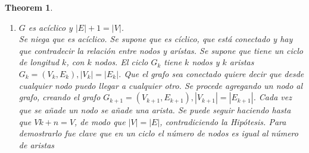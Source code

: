 \documentclass[12pt, fleqn]{article}
\newtheorem{theorem}{Theorem}[section]
\begin{document}
\begin{theorem}
\begin{enumerate}
\begin{proof}
\begin{enumerate}
                                \item Hipótesis de inducción: se supone que el predicado es válido para $k$ aristas. El predicado es que la relación entre nodos y aristas
                                    es  $|E| + 1 = |V| $. Se supone que está conectado y si se quita cualquier arista se desconecta el grafo.
                                \item Se toma cualquier grafo de $k+1$ aristas. Por la Hipótesis se que si se quita una arista se desconecta y quedan
                                    $G_1=(V_1, E_1)$ y  $G_2=(V_2, E_2)$ donde $ 0 \leq |E_1|, |E_2| \leq k$ Lo que queda de los dos lados debe tener
                                    $k$ o menos de $k$ aristas.
                                \item se aplica inducción fuerte.
                                    \begin{align*}
                                        |V| &= |V_1| + |V_2|\\
                                        |V| &= (|E_1| + 1) + (|E_2| + 1)\\
                                        |V| &= (|E_1| + |E_2| +1) + 1\\
                                        |V| &= |E| + 1
                                    \end{align*}
                            \end{enumerate}
                        \end{proof}
                    \item $G$ es acíclico y $|E| + 1 = |V|$. \\ \emph{ Se niega que es acíclico. Se supone que es cíclico, que está conectado y hay
                                que contradecir la relación entre nodos y arístas. Se supone que tiene un ciclo de longitud $k$, con $k$ nodos.
                                El ciclo $G_k$ tiene $k$ nodos y $k$ aristas $G_k=(V_k, E_k), |V_k| = |E_k| $. Que el grafo sea conectado quiere decir que
                                desde cualquier nodo puedo llegar a cualquier otro. Se procede agregando un nodo al grafo, creando el grafo
                                $G_{k+1} = (V_{k+1}, E_{k+1}), |V_{k+1}| = |E_{k+1}| $. Cada vez que se añade un nodo se añade una arista.
                                Se puede seguir haciendo hasta que $V{k+n} = V$, de modo que $|V| = |E|$, contradiciendo la Hipótesis. Para demostrarlo fue clave
                                que en un ciclo el número de nodos es igual al número de aristas }

\end{enumerate}
\end{theorem}
\end{document}

